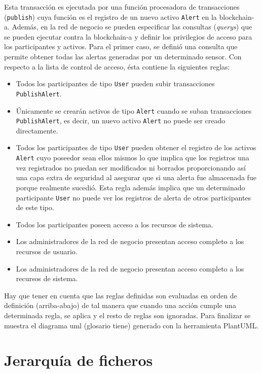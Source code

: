 \documentclass[12pt,a4paper, twoside]{report}
\begin{document}
	Esta transacción es ejecutada por una función procesadora de transacciones (\texttt{publish}) cuya función es el registro de un nuevo activo \texttt{Alert} en la \gls{blockchain-a}. Además, en la red de negocio se pueden especificar las consultas (\textit{querys}) que se pueden ejecutar contra la \gls{blockchain-a} y definir los privilegios de acceso para los participantes y activos. Para el primer caso, se definió una consulta que permite obtener todas las alertas generadas por un determinado sensor. Con respecto a la lista de control de acceso, ésta contiene la siguientes reglas:
	
	\begin{itemize}
		\item Todos los participantes de tipo \texttt{User} pueden subir transacciones \texttt{PublishAlert}.
		\item Únicamente se crearán activos de tipo \texttt{Alert} cuando se suban transacciones \texttt{PublishAlert}, es decir, un nuevo activo \texttt{Alert} no puede ser creado directamente.
		\item Todos los participantes de tipo \texttt{User} pueden obtener el registro de los  activos \texttt{Alert} cuyo poseedor sean ellos mismos lo que implica que los registros una vez registrados no puedan ser modificados ni borrados proporcionando así una capa extra de seguridad al asegurar que si una alerta fue almacenada fue porque realmente sucedió. Esta regla además implica que un determinado participante \texttt{User} no puede ver los registros de alerta de otros participantes de este tipo.
		\item Todos los participantes poseen acceso a los recursos de sistema.
		\item Los administradores de la red de negocio presentan acceso completo a los recursos de usuario.
		\item Los administradores de la red de negocio presentan acceso completo a los recursos de sistema.
	\end{itemize}

	Hay que tener en cuenta que las reglas definidas son evaluadas en orden de definición (arriba-abajo) de tal manera que cuando una acción cumple una determinada regla, se aplica y el resto de reglas son ignoradas. Para finalizar se muestra el diagrama uml (glosario tiene) generado con la herramienta PlantUML. %
	
	\section{Jerarquía de ficheros} %
	
\end{document}
